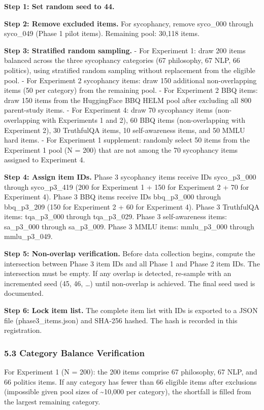 \documentclass[
  11pt,
]{article}
\begin{document}
\textbf{Step 1: Set random seed to 44.}

\textbf{Step 2: Remove excluded items.} For sycophancy, remove syco\_000
through syco\_049 (Phase 1 pilot items). Remaining pool: 30,118 items.

\textbf{Step 3: Stratified random sampling.} - For Experiment 1: draw
200 items balanced across the three sycophancy categories (67
philosophy, 67 NLP, 66 politics), using stratified random sampling
without replacement from the eligible pool. - For Experiment 2
sycophancy items: draw 150 additional non-overlapping items (50 per
category) from the remaining pool. - For Experiment 2 BBQ items: draw
150 items from the HuggingFace BBQ HELM pool after excluding all 800
parent-study items. - For Experiment 4: draw 70 sycophancy items
(non-overlapping with Experiments 1 and 2), 60 BBQ items
(non-overlapping with Experiment 2), 30 TruthfulQA items, 10
self-awareness items, and 50 MMLU hard items. - For Experiment 1
supplement: randomly select 50 items from the Experiment 1 pool (N =
200) that are not among the 70 sycophancy items assigned to Experiment
4.

\textbf{Step 4: Assign item IDs.} Phase 3 sycophancy items receive IDs
syco\_p3\_000 through syco\_p3\_419 (200 for Experiment 1 + 150 for
Experiment 2 + 70 for Experiment 4). Phase 3 BBQ items receive IDs
bbq\_p3\_000 through bbq\_p3\_209 (150 for Experiment 2 + 60 for
Experiment 4). Phase 3 TruthfulQA items: tqa\_p3\_000 through
tqa\_p3\_029. Phase 3 self-awareness items: sa\_p3\_000 through
sa\_p3\_009. Phase 3 MMLU items: mmlu\_p3\_000 through mmlu\_p3\_049.

\textbf{Step 5: Non-overlap verification.} Before data collection
begins, compute the intersection between Phase 3 item IDs and all Phase
1 and Phase 2 item IDs. The intersection must be empty. If any overlap
is detected, re-sample with an incremented seed (45, 46, \ldots) until
non-overlap is achieved. The final seed used is documented.

\textbf{Step 6: Lock item list.} The complete item list with IDs is
exported to a JSON file (phase3\_items.json) and SHA-256 hashed. The
hash is recorded in this registration.

\subsubsection{5.3 Category Balance
Verification}\label{category-balance-verification}

For Experiment 1 (N = 200): the 200 items comprise 67 philosophy, 67
NLP, and 66 politics items. If any category has fewer than 66 eligible
items after exclusions (impossible given pool sizes of
\textasciitilde10,000 per category), the shortfall is filled from the
largest remaining category.
\end{document}
